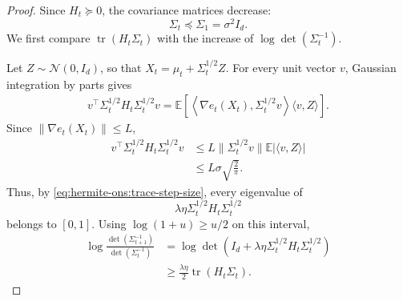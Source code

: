 \documentclass{article}
\theoremstyle{plain}
\theoremstyle{definition}
\theoremstyle{plain}
\newcommand{\tr}{\operatorname{tr}}
\newcommand{\E}{\mathbb E}
\newcommand{\cN}{\mathcal N}
\begin{document}
\begin{proof}
    Since $H_t\succeq0$, the covariance matrices decrease:
    \[
        \Sigma_t\preceq\Sigma_1=\sigma^2I_d.
    \]
    We first compare $\tr(H_t\Sigma_t)$ with the increase of
    $\log\det(\Sigma_t^{-1})$.

    Let $Z\sim\cN(0,I_d)$, so that
    $X_t=\mu_t+\Sigma_t^{1/2}Z$. For every unit vector $v$, Gaussian
    integration by parts gives
    \begin{align}
        v^\top\Sigma_t^{1/2}H_t\Sigma_t^{1/2}v
        =
        \E\left[
            \left\langle
            \nabla e_t(X_t),\Sigma_t^{1/2}v
            \right\rangle
            \langle v,Z\rangle
            \right].
    \end{align}
    Since $\|\nabla e_t(X_t)\|\leq L$,
    \begin{align}
        v^\top\Sigma_t^{1/2}H_t\Sigma_t^{1/2}v
         & \leq
        L\|\Sigma_t^{1/2}v\|
        \E|\langle v,Z\rangle|
        \nonumber \\
         & \leq
        L\sigma\sqrt{\frac{2}{\pi}}.
        \label{eq:hermite-ons:normalized-hessian}
    \end{align}
    Thus, by \eqref{eq:hermite-ons:trace-step-size}, every eigenvalue
    of
    \[
        \lambda\eta
        \Sigma_t^{1/2}H_t\Sigma_t^{1/2}
    \]
    belongs to $[0,1]$. Using $\log(1+u)\geq u/2$ on this interval,
    \begin{align}
        \log\frac{\det(\Sigma_{t+1}^{-1})}
        {\det(\Sigma_t^{-1})}
         & =
        \log\det\left(
        I_d+\lambda\eta
        \Sigma_t^{1/2}H_t\Sigma_t^{1/2}
        \right)
        \nonumber \\
         & \geq
        \frac{\lambda\eta}{2}\tr(H_t\Sigma_t).
        \label{eq:hermite-ons:trace-logdet-lower}
    \end{align}


\end{proof}
\end{document}
